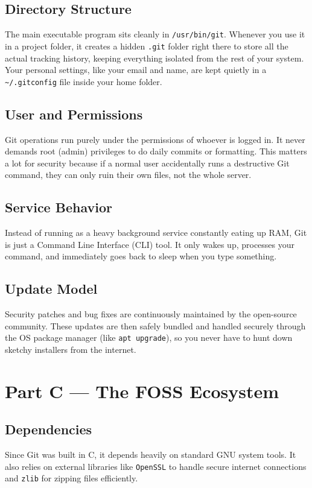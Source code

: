 \documentclass[12pt,a4paper]{report}
\begin{document}
\subsection{Directory Structure}
The main executable program sits cleanly in \texttt{/usr/bin/git}. Whenever you use it in a project folder, it creates a hidden \texttt{.git} folder right there to store all the actual tracking history, keeping everything isolated from the rest of your system. Your personal settings, like your email and name, are kept quietly in a \texttt{\~{}/.gitconfig} file inside your home folder. 

\subsection{User and Permissions}
Git operations run purely under the permissions of whoever is logged in. It never demands root (admin) privileges to do daily commits or formatting. This matters a lot for security because if a normal user accidentally runs a destructive Git command, they can only ruin their own files, not the whole server.

\subsection{Service Behavior}
Instead of running as a heavy background service constantly eating up RAM, Git is just a Command Line Interface (CLI) tool. It only wakes up, processes your command, and immediately goes back to sleep when you type something.

\subsection{Update Model}
Security patches and bug fixes are continuously maintained by the open-source community. These updates are then safely bundled and handled securely through the OS package manager (like \texttt{apt upgrade}), so you never have to hunt down sketchy installers from the internet.

\section{Part C --- The FOSS Ecosystem}

\subsection{Dependencies}
Since Git was built in C, it depends heavily on standard GNU system tools. It also relies on external libraries like \texttt{OpenSSL} to handle secure internet connections and \texttt{zlib} for zipping files efficiently.
\end{document}
